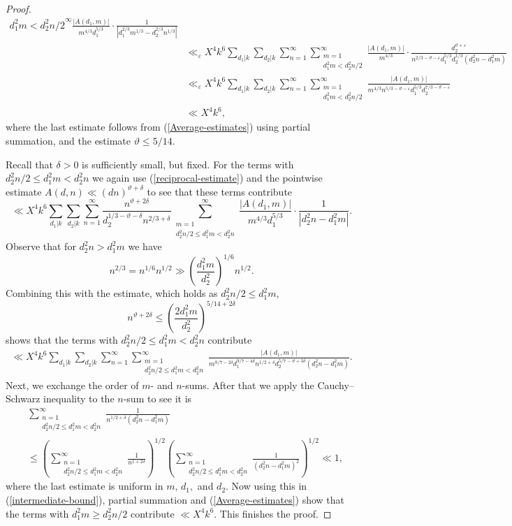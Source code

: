 \documentclass[a4paper,10pt,twoside]{amsart}
\theoremstyle{definition}
\numberwithin{equation}{section}
\renewcommand\d{\textnormal{ d}}
\renewcommand\:{\colon}
\begin{document}
\begin{proof}
\begin{align*}
{{d_1^2m< d_2^2n/2}}^\infty\frac{\left|A(d_1,m)\right|}{m^{4/3}d_1^{5/3}}\cdot\frac{1}{\left|d_1^{2/3}m^{1/3}-d_2^{2/3}n^{1/3}\right|}\\
&\ll_\varepsilon X^4k^6\sum_{d_1|k}\sum_{d_2|k}\sum_{n=1}^\infty\sum_{\substack{m=1\\
d_1^2m<d_2^2n/2}}^\infty\frac{|A(d_1,m)|}{m^{4/3}}\cdot\frac{d_2^{\vartheta+\varepsilon}}{n^{2/3-\vartheta-\varepsilon}d_1^{5/3}d_2^{1/3}(d_2^2n-d_1^2m)}\\
&\ll_\varepsilon X^4k^6\sum_{d_1|k}\sum_{d_2|k}\sum_{n=1}^\infty\sum_{\substack{m=1\\
d_1^2m<d_2^2n/2}}^\infty\frac{|A(d_1,m)|}{m^{4/3}n^{5/3-\vartheta-\varepsilon}d_1^{5/3}d_2^{7/3-\vartheta-\varepsilon}}\\
&\ll X^4k^6,
\end{align*}
where the last estimate follows from (\ref{Average-estimates}) using partial summation, and the estimate $\vartheta\leq 5/14$. 

Recall that $\delta>0$ is sufficiently small, but fixed. For the terms with $d_2^2n/2\leq d_1^2m<d_2^2n$ we again use (\ref{reciprocal-estimate}) and the pointwise estimate $A(d,n)\ll (dn)^{\vartheta+\delta}$ to see that these terms contribute
\[
\ll X^4k^6\sum_{d_1|k}\sum_{d_2|k}\sum_{n=1}^\infty\frac{n^{\vartheta+2\delta}}{d_2^{1/3-\vartheta-\delta}n^{2/3+\delta}}\sum_{\substack{m=1\\ d_2^2n/2\leq d_1^2m< d_2^2n}}^\infty\frac{|A(d_1,m)|}{m^{4/3}d_1^{5/3}}\cdot\frac1{|d_2^2n-d_1^2m|}.\]
Observe that for $d_2^2n>d_1^2m$ we have
\[ 
n^{2/3}=n^{1/6}n^{1/2}\gg\left(\frac{d_1^2m}{d_2^2}\right)^{1/6}n^{1/2}.\]
Combining this with the estimate, which holds as $d_2^2n/2\leq d_1^2m$, 
\[ 
n^{\vartheta+2\delta}\leq\left(\frac{2d_1^2m}{d_2^2}\right)^{5/14+2\delta}\]
shows that the terms with $d_2^2n/2\leq d_1^2m<d_2^2n$ contribute
\begin{align}\label{intermediate-bound}
\ll X^4k^6\sum_{d_1|k}\sum_{d_2|k}\sum_{n=1}^\infty\sum_{\substack{m=1\\
d_2^2n/2\leq d_1^2m<d_2^2n}}^\infty\frac{|A(d_1,m)|}{m^{8/7-2\delta}d_1^{9/7-4\delta}n^{1/2+\delta}d_2^{5/7-\vartheta+3\delta}(d_2^2n-d_1^2m)}.
\end{align}
Next, we exchange the order of $m$- and $n$-sums. After that we apply the Cauchy--Schwarz inequality to the $n$-sum to see it is
\begin{align*}
&\sum_{\substack{n=1\\d_2^2n/2\leq d_1^2m<d_2^2n}}^\infty\frac1{n^{1/2+\delta}(d_2^2n-d_1^2m)}\\
&\leq\left(\sum_{\substack{n=1\\d_2^2n/2\leq d_1^2m<d_2^2n}}^\infty\frac1{n^{1+2\delta}}\right)^{1/2}\left(\sum_{\substack{n=1\\d_2^2n/2\leq d_1^2m<d_2^2n}}^\infty\frac1{(d_2^2n-d_1^2m)^2}\right)^{1/2}\ll 1,
\end{align*}
where the last estimate is uniform in $m,\,d_1,$ and $d_2$. Now using this in (\ref{intermediate-bound}), partial summation and (\ref{Average-estimates}) show that the terms with $d_1^2m\geq d_2^2n/2$ contribute $\ll X^4k^6$. This finishes the proof.  
\end{proof}
\end{document}
